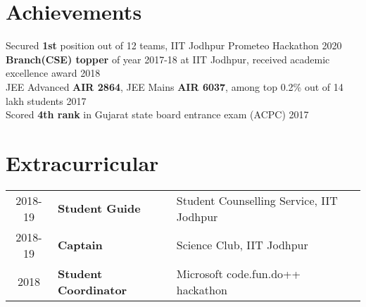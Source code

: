 \documentclass[a4paper]{single-column}
\begin{document}
\sectionsep
\section{Achievements}
{Secured \textbf{1st} position out of 12 teams, IIT Jodhpur Prometeo Hackathon \hfill 2020}\\
{\textbf{Branch(CSE) topper} of year 2017-18 at IIT Jodhpur, received academic excellence award \hfill 2018}\\
{JEE Advanced \textbf{AIR 2864}, JEE Mains \textbf{AIR 6037}, among top 0.2\% out of 14 lakh students \hfill 2017}\\
{Scored \textbf{4th rank} in Gujarat state board entrance exam (ACPC) \hfill 2017}

\sectionsep
\section{Extracurricular}
\begin{tabular}{ c l l }
2018-19 & \textbf{Student Guide} & Student Counselling Service, IIT Jodhpur \\
2018-19 & \textbf{Captain} & Science Club, IIT Jodhpur \\
2018  & \textbf{Student Coordinator} & Microsoft code.fun.do++ hackathon\\ 
\end{tabular}
\end{document}

